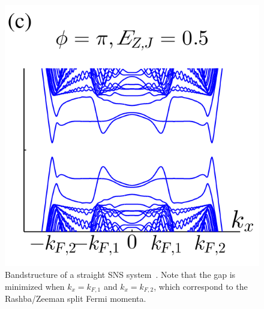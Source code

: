         \begin{figure}[!htb]
        \centering
        \includegraphics[width=0.5\columnwidth]{figures/pientka_bandstructure}
        \caption{Bandstructure of a straight SNS system~\cite{pientka_topological_2017}.
        Note that the gap is minimized when $k_x=k_{F,1}$ and $k_x=k_{F,2}$, which correspond to the Rashba/Zeeman split Fermi momenta.}
        \label{fig:pientka_bandstructure}
        \end{figure}